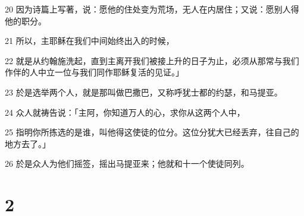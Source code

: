 \par 20 因为诗篇上写著，说：愿他的住处变为荒场，无人在内居住；又说：愿别人得他的职分。
\par 21 所以，主耶稣在我们中间始终出入的时候，
\par 22 就是从约翰施洗起，直到主离开我们被接上升的日子为止，必须从那常与我们作伴的人中立一位与我们同作耶稣复活的见证。」
\par 23 於是选举两个人，就是那叫做巴撒巴，又称呼犹士都的约瑟，和马提亚。
\par 24 众人就祷告说：「主阿，你知道万人的心，求你从这两个人中，
\par 25 指明你所拣选的是谁，叫他得这使徒的位分。这位分犹大已经丢弃，往自己的地方去了。」
\par 26 於是众人为他们摇签，摇出马提亚来；他就和十一个使徒同列。

\chapter{2}

